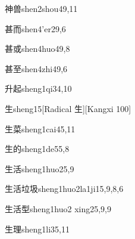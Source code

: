 \begin{verbete}{神兽}{shen2shou4}{9,11}
\end{verbete}

\begin{verbete}{甚而}{shen4'er2}{9,6}
\end{verbete}

\begin{verbete}{甚或}{shen4huo4}{9,8}
\end{verbete}

\begin{verbete}{甚至}{shen4zhi4}{9,6}
\end{verbete}

\begin{verbete}{升起}{sheng1qi3}{4,10}
\end{verbete}

\begin{verbete}{生}{sheng1}{5}[Radical 生][Kangxi 100]
\end{verbete}

\begin{verbete}{生菜}{sheng1cai4}{5,11}
\end{verbete}

\begin{verbete}{生的}{sheng1de5}{5,8}
\end{verbete}

\begin{verbete}{生活}{sheng1huo2}{5,9}
\end{verbete}

\begin{verbete}{生活垃圾}{sheng1huo2la1ji1}{5,9,8,6}
\end{verbete}

\begin{verbete}{生活型}{sheng1huo2 xing2}{5,9,9}
\end{verbete}

\begin{verbete}{生理}{sheng1li3}{5,11}
\end{verbete}

